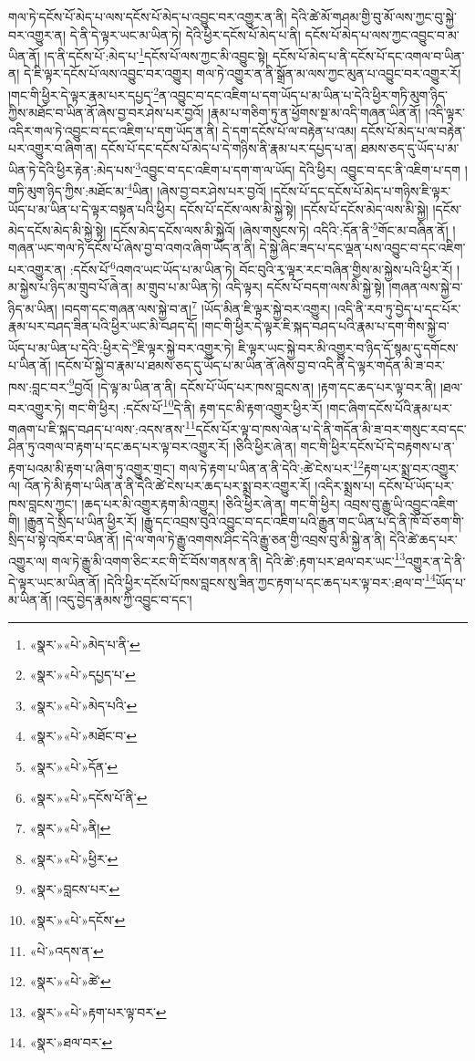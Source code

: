 གལ་ཏེ་དངོས་པོ་མེད་པ་ལས་དངོས་པོ་མེད་པ་འབྱུང་བར་འགྱུར་ན་ནི། དེའི་ཚེ་མོ་གཤམ་གྱི་བུ་མོ་ལས་ཀྱང་བུ་སྐྱེ་བར་འགྱུར་ན། དེ་ནི་དེ་ལྟར་ཡང་མ་ཡིན་ཏེ། དེའི་ཕྱིར་དངོས་པོ་མེད་པ་ནི། དངོས་པོ་མེད་པ་ལས་ཀྱང་འབྱུང་བ་མ་ཡིན་ནོ། །ད་ནི་དངོས་པོ་:མེད་པ་\footnote{«སྣར་»«པེ་»མེད་པ་ནི་}དངོས་པོ་ལས་ཀྱང་མི་འབྱུང་སྟེ། དངོས་པོ་མེད་པ་ནི་དངོས་པོ་དང་འགལ་བ་ཡིན་ན། དེ་ཇི་ལྟར་དངོས་པོ་ལས་འབྱུང་བར་འགྱུར། གལ་ཏེ་འགྱུར་ན་ནི་སྒྲོན་མ་ལས་ཀྱང་མུན་པ་འབྱུང་བར་འགྱུར་རོ། །གང་གི་ཕྱིར་དེ་ལྟར་རྣམ་པར་དཔྱད་\footnote{«སྣར་»«པེ་»དཔྱད་པ་}ན་འབྱུང་བ་དང་འཇིག་པ་དག་ཡོད་པ་མ་ཡིན་པ་དེའི་ཕྱིར་གཏི་མུག་ཉིད་ཀྱིས་མཐོང་བ་ཡིན་ནོ་ཞེས་བྱ་བར་ཤེས་པར་བྱའོ། །རྣམ་པ་གཅིག་ཏུ་ན་ཕྱོགས་སྔ་མ་འདི་གཞན་ཡིན་ནོ། །འདི་ལྟར་འདིར་གལ་ཏེ་འབྱུང་བ་དང་འཇིག་པ་དག་ཡོད་ན་ནི། དེ་དག་དངོས་པོ་ལ་བརྟེན་པ་འམ། དངོས་པོ་མེད་པ་ལ་བརྟེན་པར་འགྱུར་བ་ཞིག་ན། དངོས་པོ་དང་དངོས་པོ་མེད་པ་དེ་གཉིས་ནི་རྣམ་པར་དཔྱད་པ་ན། ཐམས་ཅད་དུ་ཡོད་པ་མ་ཡིན་ཏེ་དེའི་ཕྱིར་རྟེན་:མེད་པས་\footnote{«སྣར་»«པེ་»མེད་པའི་}འབྱུང་བ་དང་འཇིག་པ་དག་ག་ལ་ཡོད། དེའི་ཕྱིར། འབྱུང་བ་དང་ནི་འཇིག་པ་དག །གཏི་མུག་ཉིད་ཀྱིས་:མཐོང་མ་\footnote{«སྣར་»«པེ་»མཐོང་བ་}ཡིན། །ཞེས་བྱ་བར་ཤེས་པར་བྱའོ། །དངོས་པོ་དང་དངོས་པོ་མེད་པ་གཉིས་ཇི་ལྟར་ཡོད་པ་མ་ཡིན་པ་དེ་ལྟར་བསྟན་པའི་ཕྱིར། དངོས་པོ་དངོས་ལས་མི་སྐྱེ་སྟེ། །དངོས་པོ་དངོས་མེད་ལས་མི་སྐྱེ། །དངོས་མེད་དངོས་མེད་མི་སྐྱེ་སྟེ། །དངོས་མེད་དངོས་ལས་མི་སྐྱེའོ། །ཞེས་གསུངས་ཏེ། འདིའི་:དོན་ནི་\footnote{«སྣར་»«པེ་»དོན་}གོང་མ་བཞིན་ནོ། །གཞན་ཡང་གལ་ཏེ་དངོས་པོ་ཞེས་བྱ་བ་འགའ་ཞིག་ཡོད་ན་ནི། དེ་སྐྱེ་ཞིང་ཟད་པ་དང་ལྡན་པས་འབྱུང་བ་དང་འཇིག་པར་འགྱུར་ན། :དངོས་པོ་\footnote{«སྣར་»«པེ་»དངོས་པོ་ནི་}འགའ་ཡང་ཡོད་པ་མ་ཡིན་ཏེ། བོང་བུའི་རྭ་ལྟར་རང་བཞིན་གྱིས་མ་སྐྱེས་པའི་ཕྱིར་རོ། །མ་སྐྱེས་པ་ཉིད་མ་གྲུབ་པོ་ཞེ་ན། མ་གྲུབ་པ་མ་ཡིན་ཏེ། འདི་ལྟར། དངོས་པོ་བདག་ལས་མི་སྐྱེ་སྟེ། །གཞན་ལས་སྐྱེ་བ་ཉིད་མ་ཡིན། །བདག་དང་གཞན་ལས་སྐྱེ་བ་ན།\footnote{«སྣར་»«པེ་»ནི།} །ཡོད་མིན་ཇི་ལྟར་སྐྱེ་བར་འགྱུར། །འདི་ནི་རབ་ཏུ་བྱེད་པ་དང་པོར་རྣམ་པར་བཤད་ཟིན་པའི་ཕྱིར་ཡང་མི་བཤད་དོ། །གང་གི་ཕྱིར་དེ་ལྟར་ཇི་སྐད་བཤད་པའི་རྣམ་པ་དག་གིས་སྐྱེ་བ་ཡོད་པ་མ་ཡིན་པ་དེའི་:ཕྱིར་དེ་\footnote{«སྣར་»«པེ་»ཕྱིར་}ཇི་ལྟར་སྐྱེ་བར་འགྱུར་ཏེ། ཇི་ལྟར་ཡང་སྐྱེ་བར་མི་འགྱུར་བ་ཉིད་དོ་སྙམ་དུ་དགོངས་པ་ཡིན་ནོ། །དངོས་པོ་སྐྱེ་བ་རྣམ་པ་ཐམས་ཅད་དུ་ཡོད་པ་མ་ཡིན་ནོ་ཞེས་བྱ་བ་འདི་ནི་དེ་ལྟར་གདོན་མི་ཟ་བར་ཁས་:བླང་བར་\footnote{«སྣར་»བླངས་པར་}བྱའོ། །དེ་ལྟ་མ་ཡིན་ན་ནི། དངོས་པོ་ཡོད་པར་ཁས་བླངས་ན། །རྟག་དང་ཆད་པར་ལྟ་བར་ནི། །ཐལ་བར་འགྱུར་ཏེ། གང་གི་ཕྱིར། :དངོས་པོ་\footnote{«སྣར་»«པེ་»དངོས་}དེ་ནི། རྟག་དང་མི་རྟག་འགྱུར་ཕྱིར་རོ། །གང་ཞིག་དངོས་པོའི་རྣམ་པར་གཞག་པ་ཇི་སྐད་བཤད་པ་ལས་:འདས་ནས་\footnote{«པེ་»འདས་ན་}དངོས་པོར་ལྟ་བ་ཁས་ལེན་པ་དེ་ནི་གདོན་མི་ཟ་བར་གསུང་རབ་དང་ཤིན་ཏུ་འགལ་བ་རྟག་པ་དང་ཆད་པར་ལྟ་བར་འགྱུར་རོ། །ཅིའི་ཕྱིར་ཞེ་ན། གང་གི་ཕྱིར་དངོས་པོ་དེ་བརྟགས་པ་ན་རྟག་པའམ་མི་རྟག་པ་ཞིག་ཏུ་འགྱུར་གྲང་། གལ་ཏེ་རྟག་པ་ཡིན་ན་ནི་དེའི་:ཚེ་ངེས་པར་\footnote{«སྣར་»«པེ་»ཚེ་}རྟག་པར་སྨྲ་བར་འགྱུར་ལ། འོན་ཏེ་མི་རྟག་པ་ཡིན་ན་ནི་དེའི་ཚེ་ངེས་པར་ཆད་པར་སྨྲ་བར་འགྱུར་རོ། །འདིར་སྨྲས་པ། དངོས་པོ་ཡོད་པར་ཁས་བླངས་ཀྱང་། །ཆད་པར་མི་འགྱུར་རྟག་མི་འགྱུར། །ཅིའི་ཕྱིར་ཞེ་ན། གང་གི་ཕྱིར། འབྲས་བུ་རྒྱུ་ཡི་འབྱུང་འཇིག་གི། །རྒྱུན་དེ་སྲིད་པ་ཡིན་ཕྱིར་རོ། །རྒྱུ་དང་འབྲས་བུའི་འབྱུང་བ་དང་འཇིག་པའི་རྒྱུན་གང་ཡིན་པ་དེ་ནི་ཁོ་བོ་ཅག་གི་སྲིད་པ་སྟེ་འཁོར་བ་ཡིན་ནོ། །དེ་ལ་གལ་ཏེ་རྒྱུ་འགགས་ཤིང་དེའི་རྒྱུ་ཅན་གྱི་འབྲས་བུ་མི་སྐྱེ་ན་ནི། དེའི་ཚེ་ཆད་པར་འགྱུར་ལ། གལ་ཏེ་རྒྱུ་མི་འགག་ཅིང་རང་གི་ངོ་བོས་གནས་ན་ནི། དེའི་ཚེ་:རྟག་པར་ཐལ་བར་ཡང་\footnote{«སྣར་»«པེ་»རྟག་པར་ལྟ་བར་}འགྱུར་ན་དེ་ནི་དེ་ལྟར་ཡང་མ་ཡིན་ནོ། །དེའི་ཕྱིར་དངོས་པོ་ཁས་བླངས་སུ་ཟིན་ཀྱང་རྟག་པ་དང་ཆད་པར་ལྟ་བར་:ཐལ་བ་\footnote{«སྣར་»ཐལ་བར་}ཡོད་པ་མ་ཡིན་ནོ། །འདུ་བྱེད་རྣམས་ཀྱི་འབྱུང་བ་དང་། 